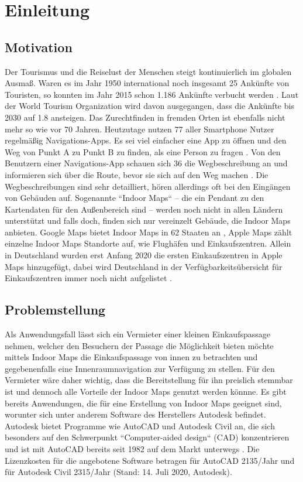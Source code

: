 \chapter{Einleitung}

\section{Motivation}
Der Tourismus und die Reiselust der Menschen steigt kontinuierlich im globalen Ausmaß. Waren es im Jahr 1950 international noch insgesamt \SI{25}{\mio} Ankünfte von Touristen, so konnten im Jahr 2015 schon \SI{1.186}{\mrd} Ankünfte verbucht werden \parencite{GLA2017}. Laut der World Tourism Organization wird davon ausgegangen, dass die Ankünfte bis 2030 auf \SI{1.8}{\mrd} ansteigen. Das Zurechtfinden in fremden Orten ist ebenfalls nicht mehr so wie vor 70 Jahren. Heutzutage nutzen \SI{77}{\prc} aller Smartphone Nutzer regelmäßig Navigations-Apps. Es sei viel einfacher eine App zu öffnen und den Weg von Punkt A zu Punkt B zu finden, als eine Person zu fragen \parencite{PAN2018}.%
%
Von den Benutzern einer Navigations-App schauen sich \SI{36}{\prc} die Wegbeschreibung an und informieren sich über die Route, bevor sie sich auf den Weg machen \parencite{PAN2018}. Die Wegbeschreibungen sind sehr detailliert, hören allerdings oft bei den Eingängen von Gebäuden auf. Sogenannte ``Indoor Maps`` – die ein Pendant zu den Kartendaten für den Außenbereich sind – werden noch nicht in allen Ländern unterstützt und falls doch, finden sich nur vereinzelt Gebäude, die Indoor Maps anbieten. Google Maps bietet Indoor Maps in 62 Staaten an \parencite{GOO2020}, Apple Maps zählt einzelne Indoor Maps Standorte auf, wie Flughäfen und Einkaufszentren. Allein in Deutschland wurden erst Anfang 2020 die ersten Einkaufszentren in Apple Maps hinzugefügt, dabei wird Deutschland in der Verfügbarkeitsübersicht für Einkaufszentren immer noch nicht aufgelistet \parencite{OES2020}.%
%
\section{Problemstellung}
Als Anwendungsfall lässt sich ein Vermieter einer kleinen Einkaufspassage nehmen, welcher den Besuchern der Passage die Möglichkeit bieten möchte mittels Indoor Maps die Einkaufspassage von innen zu betrachten und gegebenenfalls eine Innenraumnavigation zur Verfügung zu stellen. Für den Vermieter wäre daher wichtig, dass die Bereitstellung für ihn preislich stemmbar ist und dennoch alle Vorteile der Indoor Maps genutzt werden könnne.\pbreak%
%
Es gibt bereits Anwendungen, die für eine Erstellung von Indoor Maps geeignet sind, worunter sich unter anderem Software des Herstellers Autodesk befindet. Autodesk bietet Programme wie AutoCAD und Autodesk Civil an, die sich besonders auf den Schwerpunkt ``Computer-aided design`` (CAD) konzentrieren und ist mit AutoCAD bereits seit 1982 auf dem Markt unterwegs \parencite{HUR2008}. Die Lizenzkosten für die angebotene Software betragen für AutoCAD \SI{2135}{\eur}/Jahr und für Autodesk Civil \SI{2315}{\eur}/Jahr (Stand: 14. Juli 2020, Autodesk).

